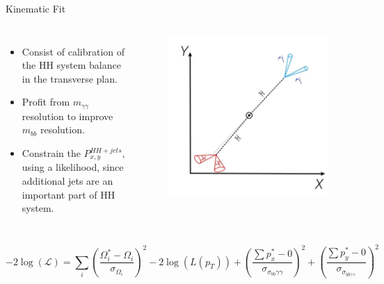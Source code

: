 \begin{frame}{Kinematic Fit}
\begin{columns}

\begin{itemize}
    \item Consist of calibration of the HH system
balance in the transverse plan.
    \item Profit from $m_{\gamma\gamma}$ resolution to
improve $m_{bb}$ resolution.

    \item Constrain the $P_{x,y}^{HH+jets}$, using a
likelihood, since additional jets are
an important part of HH system.
\end{itemize}

    
\begin{figure}
    \centering
    \includegraphics[width=.8\textwidth]{BackUp/Part7/Img/HH.png}
\end{figure}
    
\end{columns}  

\begin{equation*}
-2 \log (\mathcal{L})=\sum_{i}\left(\frac{\Omega_{i}^{*}-\Omega_{i}}{\sigma_{\Omega_{i}}}\right)^{2}-2 \log \left(L\left(p_{T}\right)\right)+\left(\frac{\sum p_{x}^{*}-0}{\sigma_{\sigma_{b b} \gamma \gamma}}\right)^{2}+\left(\frac{\sum p_{y}^{*}-0}{\sigma_{\sigma_{b \bar{b} \gamma \gamma}}}\right)^{2}
\end{equation*}    
\end{frame}

